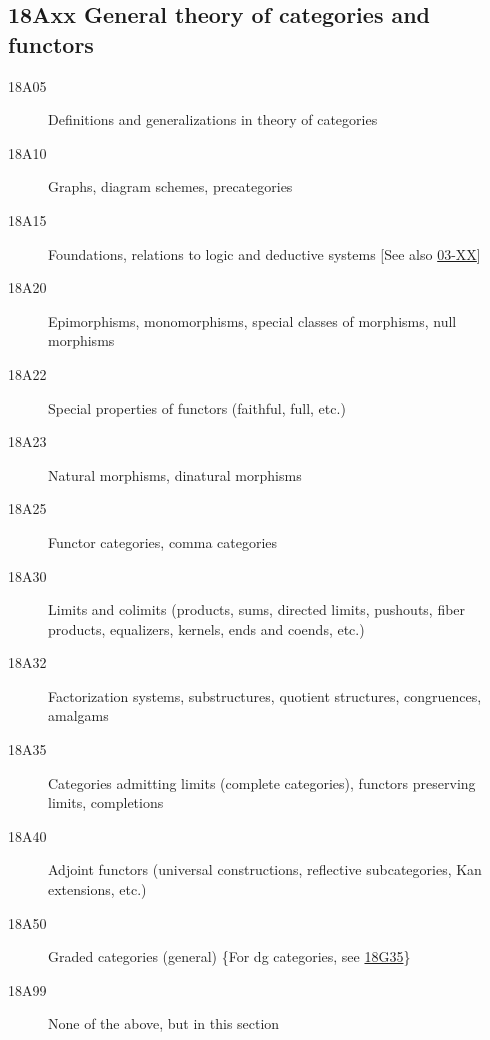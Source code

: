 \documentclass[letterpaper]{article}
\begin{document}
\subsection*{18Axx  General theory of categories and functors }\label{18Axx}
\begin{description} 
\item [18A05]\label{18A05} Definitions and generalizations in theory of categories
\item [18A10]\label{18A10} Graphs, diagram schemes, precategories
\item [18A15]\label{18A15} Foundations, relations to logic and deductive systems [See also \hyperref[03-XX]{03-XX}]
\item [18A20]\label{18A20} Epimorphisms, monomorphisms, special classes of morphisms, null morphisms
\item [18A22]\label{18A22} Special properties of functors (faithful, full, etc.)
\item [18A23]\label{18A23} Natural morphisms, dinatural morphisms
\item [18A25]\label{18A25} Functor categories, comma categories
\item [18A30]\label{18A30} Limits and colimits (products, sums, directed limits, pushouts, fiber products, equalizers, kernels, ends and coends, etc.)
\item [18A32]\label{18A32} Factorization systems, substructures, quotient structures, congruences, amalgams
\item [18A35]\label{18A35} Categories admitting limits (complete categories), functors preserving limits, completions
\item [18A40]\label{18A40} Adjoint functors (universal constructions, reflective subcategories, Kan extensions, etc.)
\item [18A50]\label{18A50} Graded categories (general) \{For dg categories, see \hyperref[18G35]{18G35}\}
\item [18A99]\label{18A99} None of the above, but in this section
\end{description}
\end{document}
